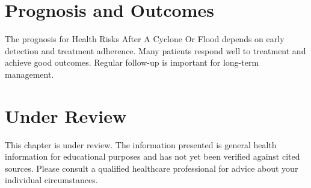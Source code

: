 \section*{Prognosis and Outcomes}
The prognosis for Health Risks After A Cyclone Or Flood depends on early detection and treatment adherence. Many patients respond well to treatment and achieve good outcomes. Regular follow-up is important for long-term management.
\section*{Under Review}
This chapter is under review. The information presented is general health information for educational purposes and has not yet been verified against cited sources. Please consult a qualified healthcare professional for advice about your individual circumstances.


\clearpage
